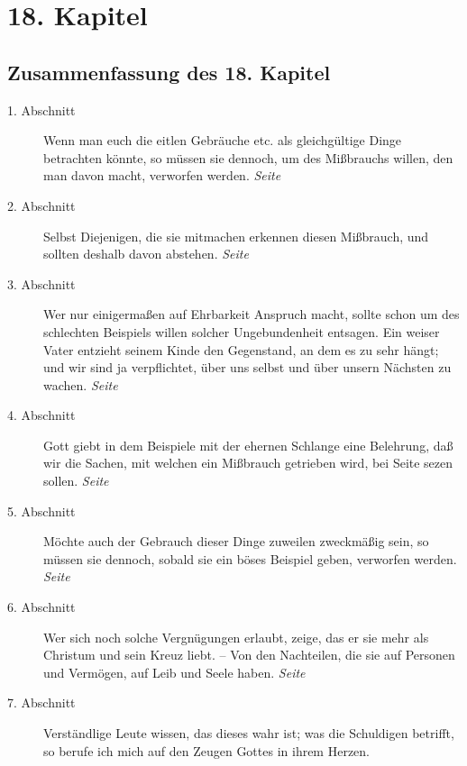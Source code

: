 
\chapter{18. Kapitel} \label{kap18}
\section{Zusammenfassung des 18. Kapitel}

\begin{description}
\item[1. Abschnitt] Wenn man euch die eitlen Gebräuche etc. als gleichgültige
Dinge betrachten könnte, so müssen sie dennoch, um des Mißbrauchs willen, den
man davon macht, verworfen werden.
\dotfill \textit{Seite~\pageref{kap18_ab1}}\\
\item[2. Abschnitt] Selbst Diejenigen, die sie mitmachen erkennen diesen
Mißbrauch, und sollten deshalb davon abstehen.
\dotfill \textit{Seite~\pageref{kap18_ab2}}\\
\item[3. Abschnitt] Wer nur einigermaßen auf Ehrbarkeit Anspruch macht, sollte
schon um des schlechten Beispiels willen solcher Ungebundenheit entsagen. Ein
weiser Vater entzieht seinem Kinde den Gegenstand, an dem es zu sehr hängt; und
wir sind ja verpflichtet, über uns selbst und über unsern Nächsten zu wachen.
\dotfill \textit{Seite~\pageref{kap18_ab3}}\\
\item[4. Abschnitt] Gott giebt in dem Beispiele mit der ehernen Schlange eine
Belehrung, daß wir die Sachen, mit welchen ein Mißbrauch getrieben wird, bei
Seite sezen sollen.
\dotfill \textit{Seite~\pageref{kap18_ab4}}\\
\item[5. Abschnitt] Möchte auch der Gebrauch dieser Dinge zuweilen zweckmäßig
sein, so müssen sie dennoch, sobald sie ein böses Beispiel geben, verworfen
werden.
\dotfill \textit{Seite~\pageref{kap18_ab5}}\\
\item[6. Abschnitt] Wer sich noch solche Vergnügungen erlaubt, zeige, das er sie
mehr als Christum und sein Kreuz liebt. -- Von den Nachteilen, die sie auf
Personen und Vermögen, auf Leib und Seele haben.
\dotfill \textit{Seite~\pageref{kap18_ab6}}\\
\item[7. Abschnitt] Verständlige Leute wissen, das dieses wahr ist; was die
Schuldigen betrifft, so berufe ich mich auf den Zeugen Gottes in ihrem Herzen.

\end{description}
